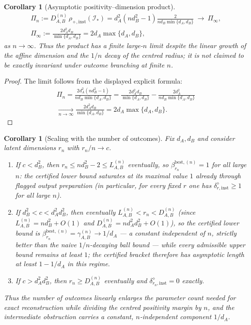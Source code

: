 \documentclass[11pt,a4paper]{article}
\newtheorem{corollary}[theorem]{Corollary}
\begin{document}
\begin{corollary}[Asymptotic positivity--dimension product]
\label{cor:asymptotic}
\begin{gather*}
\Pi_n:=D_{A,B}^{(n)}\,\rho_{\diamond,\mathrm{inst}}(\mathcal I_*)
=d_A^2(nd_B^2-1)\frac{2}{nd_B\min\{d_A,d_B\}}
\ \longrightarrow\ \Pi_\infty,\\
\Pi_\infty:=\frac{2d_A^2d_B}{\min\{d_A,d_B\}}
=2d_A\max\{d_A,d_B\},
\end{gather*}
as $n\to\infty$. Thus the product has a finite large-$n$ limit despite the linear growth of the affine dimension and the $1/n$ decay of the centred radius; it is not claimed to be exactly invariant under outcome branching at finite $n$.
\end{corollary}

\begin{proof}
The limit follows from the displayed explicit formula:
\begin{gather*}
\Pi_n=\frac{2d_A^2(nd_B^2-1)}{nd_B\min\{d_A,d_B\}}
=\frac{2d_A^2d_B}{\min\{d_A,d_B\}}-\frac{2d_A^2}{nd_B\min\{d_A,d_B\}}\\
\xrightarrow[n\to\infty]{}\frac{2d_A^2d_B}{\min\{d_A,d_B\}}
=2d_A\max\{d_A,d_B\}.
\end{gather*}
\end{proof}

\begin{corollary}[Scaling with the number of outcomes]
\label{cor:scaling}
Fix $d_A,d_B$ and consider latent dimensions $r_n$ with $r_n/n\to c$.
\begin{enumerate}[leftmargin=*,itemsep=2pt]
\item If $c<d_B^2$, then $r_n\le nd_B^2-2\le L_{A,B}^{(n)}$ eventually, so $\beta_{r_n}^{\mathrm{best},(n)}=1$ for all large $n$: the certified lower bound saturates at its maximal value $1$ already through flagged output preparation (in particular, for every fixed $r$ one has $\delta_{r,\mathrm{inst}}^{\diamond}\ge1$ for all large $n$).
\item If $d_B^2<c<d_A^2d_B^2$, then eventually $L_{A,B}^{(n)}<r_n<D_{A,B}^{(n)}$ (since $L_{A,B}^{(n)}=nd_B^2+O(1)$ and $D_{A,B}^{(n)}=nd_A^2d_B^2+O(1)$), so the certified lower bound is $\beta_{r_n}^{\mathrm{best},(n)}=\gamma_{A,B}^{(n)}\to1/d_A$ --- a constant independent of $n$, strictly better than the naive $1/n$-decaying ball bound --- while every admissible upper bound remains at least $1$; the certified bracket therefore has asymptotic length at least $1-1/d_A$ in this regime.
\item If $c>d_A^2d_B^2$, then $r_n\ge D_{A,B}^{(n)}$ eventually and $\delta_{r_n,\mathrm{inst}}^{\diamond}=0$ exactly.
\end{enumerate}
Thus the number of outcomes linearly enlarges the parameter count needed for exact reconstruction while dividing the centred positivity margin by $n$, and the intermediate obstruction carries a constant, $n$-independent component $1/d_A$.
\end{corollary}
\end{document}

